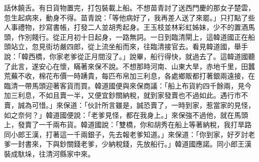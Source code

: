 話休饒舌。有日貨物置完，打包裝載上船。不想苗青討了送西門慶的那女子楚雲，忽生起病來，動身不得。苗青說：「等他病好了，我再差人送了來罷。」只打點了些人事禮物，抄寫書帳，打發二人並胡秀起身。王玉枝並林彩虹姊妹，少不的置酒馬頭，作別餞行。從正月初十日起身，一路無詞。一日到臨清閘上，這韓道國正在船頭站立，忽見街坊嚴四郎，從上流坐船而來，往臨清接官去。看見韓道國，舉手說：「韓西橋，你家老爹從正月間沒了。」說畢，船行得快，就過去了。這韓道國聽了此言，遂安心在懷，瞞著來保不說。不想那時河南、山東大旱，赤地千里，田蠶荒蕪不收，棉花布價一時踴貴，每匹布帛加三利息，各處鄉販都打著銀兩遠接，在臨清一帶馬頭迎著客貨而買。韓道國便與來保商議：「船上布貨約四千餘兩，見今加三利息，不如且賣一半，又便宜鈔關納稅，就到家發賣也不過如此。遇行市不賣，誠為可惜。」來保道：「伙計所言雖是，誠恐賣了，一時到家，惹當家的見怪，如之奈何？」韓道國便說：「老爹見怪，都在我身上。」來保強不過他，就在馬頭上，發賣了一千兩布貨。韓道國說：「雙橋，你和胡秀在船上等著納稅，我打旱路同小郎王漢，打著這一千兩銀子，先去報老爹知道。」來保道：「你到家，好歹討老爹一封書來，下與鈔關錢老爹，少納稅錢，先放船行。」韓道國應諾。同小郎王漢裝成馱垛，往清河縣家中來。


